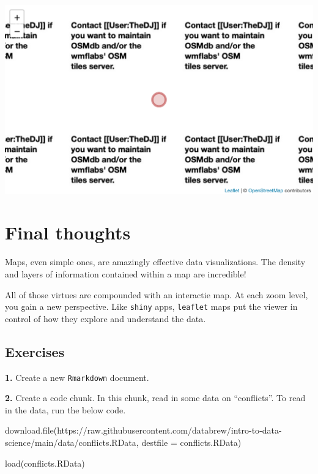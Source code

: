 \documentclass[
]{book}
\newenvironment{Shaded}{\begin{snugshade}}{\end{snugshade}}
\newcommand{\AttributeTok}[1]{\textcolor[rgb]{0.77,0.63,0.00}{#1}}
\newcommand{\FunctionTok}[1]{\textcolor[rgb]{0.00,0.00,0.00}{#1}}
\newcommand{\NormalTok}[1]{#1}
\newcommand{\StringTok}[1]{\textcolor[rgb]{0.31,0.60,0.02}{#1}}
\begin{document}
\includegraphics{figures/unnamed-chunk-230-1.pdf}

\hypertarget{final-thoughts-1}{%
\section*{Final thoughts}\label{final-thoughts-1}}

Maps, even simple ones, are amazingly effective data visualizations. The density and layers of information contained within a map are incredible!

All of those virtues are compounded with an interactie map. At each zoom level, you gain a new perspective. Like \texttt{shiny} apps, \texttt{leaflet} maps put the viewer in control of how they explore and understand the data.

\hypertarget{exercises-7}{%
\subsection*{Exercises}\label{exercises-7}}

\textbf{1.} Create a new \texttt{Rmarkdown} document.

\textbf{2.} Create a code chunk. In this chunk, read in some data on ``conflicts''. To read in the data, run the below code.

\begin{Shaded}
\begin{Highlighting}[]
\FunctionTok{download.file}\NormalTok{(}\StringTok{\textquotesingle{}https://raw.githubusercontent.com/databrew/intro{-}to{-}data{-}science/main/data/conflicts.RData\textquotesingle{}}\NormalTok{,}
              \AttributeTok{destfile =} \StringTok{\textquotesingle{}conflicts.RData\textquotesingle{}}\NormalTok{)}

\FunctionTok{load}\NormalTok{(}\StringTok{\textquotesingle{}conflicts.RData\textquotesingle{}}\NormalTok{)}
\end{Highlighting}
\end{Shaded}
\end{document}
